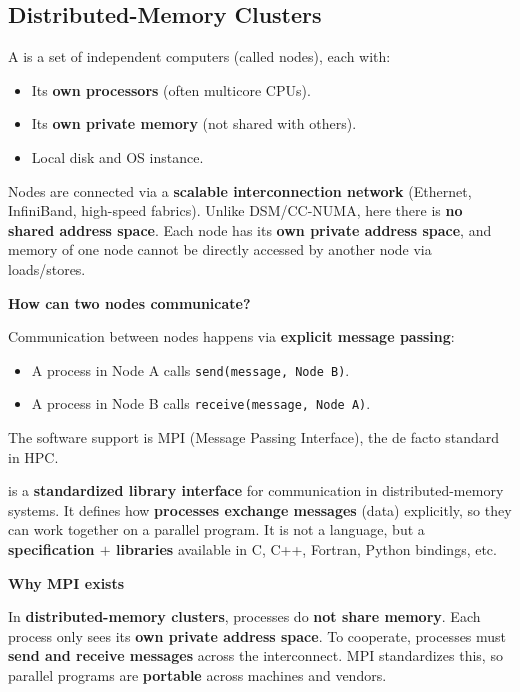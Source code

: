 \subsection{Distributed-Memory Clusters}

A  is a set of independent computers (called nodes), each with:
\begin{itemize}
    \item Its \textbf{own processors} (often multicore CPUs).
    \item Its \textbf{own private memory} (not shared with others).
    \item Local disk and OS instance.
\end{itemize}
Nodes are connected via a \textbf{scalable interconnection network} (Ethernet, InfiniBand, high-speed fabrics). Unlike DSM/CC-NUMA, here there is \textbf{no shared address space}. Each node has its \textbf{own private address space}, and memory of one node cannot be directly accessed by another node via loads/stores.

\highspace
\begin{flushleft}
    \textcolor{Green3}{ \textbf{How can two nodes communicate?}}
\end{flushleft}
Communication between nodes happens via \textbf{explicit message passing}:
\begin{itemize}
    \item A process in Node A calls \texttt{send(message, Node B)}.
    \item A process in Node B calls \texttt{receive(message, Node A)}.
\end{itemize}
The software support is MPI (Message Passing Interface), the de facto standard in HPC.

\begin{deepeningbox}[: MPI]
     is a \textbf{standardized library interface} for communication in distributed-memory systems. It defines how \textbf{processes exchange messages} (data) explicitly, so they can work together on a parallel program.  It is not a language, but a \textbf{specification $+$ libraries} available in C, C++, Fortran, Python bindings, etc.

    \highspace
    \begin{flushleft}
        \textcolor{Green3}{ \textbf{Why MPI exists}}
    \end{flushleft}
    In \textbf{distributed-memory clusters}, processes do \textbf{not share memory}. Each process only sees its \textbf{own private address space}. To cooperate, processes must \textbf{send and receive messages} across the interconnect. MPI standardizes this, so parallel programs are \textbf{portable} across machines and vendors.
\end{deepeningbox}

